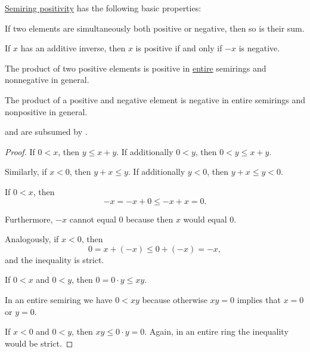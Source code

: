 \begin{proposition}\label{thm:def:ordered_semiring_positivity}
  \hyperref[def:ordered_semiring_positivity]{Semiring positivity} has the following basic properties:
  \begin{thmenum}
     If two elements are simultaneously both positive or negative, then so is their sum.

     If \( x \) has an additive inverse, then \( x \) is positive if and only if \( -x \) is negative.

     The product of two positive elements is positive in \hyperref[def:entire_semiring]{entire} semirings and nonnegative in general.

     The product of a positive and negative element is negative in entire semirings and nonpositive in general.
  \end{thmenum}
\end{proposition}
\begin{comments}
  \item {} and  are subsumed by .
\end{comments}
\begin{proof}
   If \( 0 < x \), then \( y \leq x + y \). If additionally \( 0 < y \), then \( 0 < y \leq x + y \).

  Similarly, if \( x < 0 \), then \( y + x \leq y \). If additionally \( y < 0 \), then \( y + x \leq y < 0 \).

   If \( 0 < x \), then
  \begin{equation*}
    -x = -x + 0 \leq -x + x = 0.
  \end{equation*}

  Furthermore, \( -x \) cannot equal \( 0 \) because then \( x \) would equal \( 0 \).

  Analogously, if \( x < 0 \), then
  \begin{equation*}
    0 = x + (-x) \leq 0 + (-x) = -x,
  \end{equation*}
  and the inequality is strict.


   If \( 0 < x \) and \( 0 < y \), then \( 0 = 0 \cdot y \leq xy \).

  In an entire semiring we have \( 0 < xy \) because otherwise \( xy = 0 \) implies that \( x = 0 \) or \( y = 0 \).

   If \( x < 0 \) and \( 0 < y \), then \( xy \leq 0 \cdot y = 0 \). Again, in an entire ring the inequality would be strict.
\end{proof}

